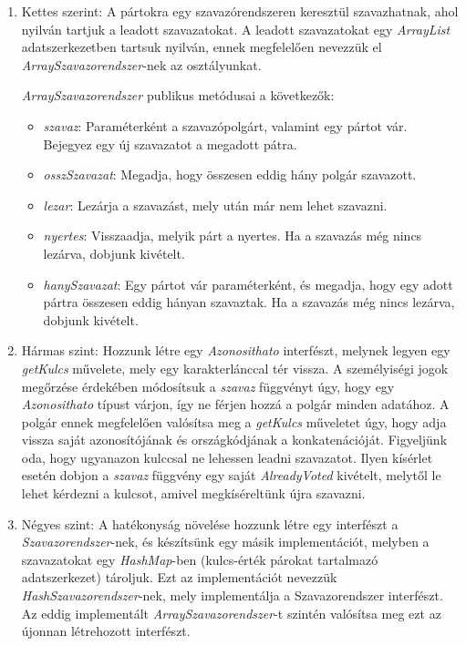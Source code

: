 \documentclass[12pt,a4paper]{article}
\begin{document}
\begin{enumerate}


\item Kettes szerint: A pártokra egy szavazórendszeren keresztül szavazhatnak, ahol nyilván tartjuk a leadott szavazatokat. A leadott szavazatokat egy \textit{ArrayList} adatszerkezetben tartsuk nyilván, ennek megfelelően nevezzük el \textit{ArraySzavazorendszer}-nek az osztályunkat.

\textit{ArraySzavazorendszer} publikus metódusai a következők:
\begin{itemize}
\item \textit{szavaz}: Paraméterként a szavazópolgárt, valamint egy pártot vár. Bejegyez egy új szavazatot a megadott pátra.
\item \textit{osszSzavazat}: Megadja, hogy összesen eddig hány polgár szavazott.
\item \textit{lezar}: Lezárja a szavazást, mely után már nem lehet szavazni.
\item \textit{nyertes}: Visszaadja, melyik párt a nyertes. Ha a szavazás még nincs lezárva, dobjunk kivételt.
\item \textit{hanySzavazat}: Egy pártot vár paraméterként, és megadja, hogy egy adott pártra összesen eddig hányan szavaztak. Ha a szavazás még nincs lezárva, dobjunk kivételt.
\end{itemize}


\item Hármas szint: Hozzunk létre egy \textit{Azonosithato} interfészt, melynek legyen egy \textit{getKulcs} művelete, mely egy karakterlánccal tér vissza. A személyiségi jogok megőrzése érdekében módosítsuk a \textit{szavaz} függvényt úgy, hogy egy \textit{Azonosithato} típust várjon, így ne férjen hozzá a polgár minden adatához. A polgár ennek megfelelően valósítsa meg a \textit{getKulcs} műveletet úgy, hogy adja vissza saját azonosítójának és országkódjának a konkatenációját. Figyeljünk oda, hogy ugyanazon kulccsal ne lehessen leadni szavazatot. Ilyen kísérlet esetén dobjon a \textit{szavaz} függvény egy saját \textit{AlreadyVoted} kivételt, melytől le lehet kérdezni a kulcsot, amivel megkíséreltünk újra szavazni.

\item Négyes szint: A hatékonyság növelése hozzunk létre egy interfészt a \textit{Szavazorendszer}-nek, és készítsünk egy másik implementációt, melyben a szavazatokat egy \textit{HashMap}-ben (kulcs-érték párokat tartalmazó adatszerkezet) tároljuk. Ezt az implementációt nevezzük \textit{HashSzavazorendszer}-nek, mely implementálja a Szavazorendszer interfészt. Az eddig implementált \textit{ ArraySzavazorendszer}-t szintén valósítsa meg ezt az újonnan létrehozott interfészt.


\end{enumerate}
\end{document}
